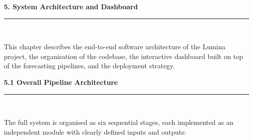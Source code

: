 \documentclass[12pt,a4paper]{report}
\begin{document}
\newpage
\thispagestyle{plain}
\begin{center}
    \hypertarget{sec:ch5}{}%
    {\Large \textbf{5. System Architecture and Dashboard}}\\[0.3cm]
    \noindent\rule{\linewidth}{0.6pt}\\[0.8cm]
\end{center}
\setlength{\parindent}{1cm}
\setlength{\parskip}{6pt}
\justifying

This chapter describes the end-to-end software architecture of the Lumina project, the organisation of the codebase, the interactive dashboard built on top of the forecasting pipelines, and the deployment strategy.

\vspace{0.5cm}
\begin{center}
    \hypertarget{sec:s51}{}%
    {\large \textbf{5.1 Overall Pipeline Architecture}}\\[0.3cm]
    \noindent\rule{\linewidth}{0.4pt}\\[0.5cm]
\end{center}

The full system is organised as six sequential stages, each implemented as an independent module with clearly defined inputs and outputs:
\end{document}
